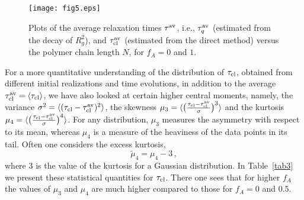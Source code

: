 \documentclass[aps,prx,reprint,showpacs,showkeys,noeprint,longbibliography]{revtex4-1} %
\begin{document}
\begin{figure}[t!]
	\centering
	\texttt{[image: fig5.eps]}
	\caption{\label{tau_fitcl}  Plots of the average relaxation times $\tau^{\rm{av}}$, i.e., $\tau_q^{\rm{av}}$ (estimated from the decay of $R_g^2$), and  $\tau_{\rm{cl}}^{\rm{av}}$ (estimated from the direct method)
		versus the polymer chain length $N$, for $f_A=0$ and $1$.}
\end{figure}
  \par 
  For a more quantitative understanding of the distribution of $\tau_{\rm{cl}}$, obtained from different initial realizations and time evolutions,  in addition to the average $\tau_{\rm{cl}}^{\rm{av}} = \langle \tau_{\rm{cl}} \rangle$, we have also looked at certain higher central moments, namely, the variance $\sigma^2=\langle (\tau_{\rm{cl}}-\tau_{\rm{cl}}^{\rm{av}})^2\rangle$, the skewness $\mu_3=\langle \big(\frac{\tau_{\rm{cl}}-\tau_{\rm{cl}}^{\rm{av}}}{\sigma}\big)^3\rangle$ and the kurtosis  $\mu_4=\langle \big(\frac{\tau_{\rm{cl}}-\tau_{\rm{cl}}^{\rm{av}}}{\sigma}\big)^4\rangle$. For any distribution, $\mu_3$ measures the asymmetry with respect to its mean, whereas $\mu_4$ is a measure of the  heaviness of the data points in its tail. Often one considers the excess kurtosis,
  \begin{equation}
  \tilde{\mu}_4 = \mu_4 -3\,,
  \end{equation}
  where $3$ is the value of the kurtosis for a Gaussian distribution. In Table~\ref{tab3} we present these statistical quantities for $\tau_{\rm{cl}}$. There one sees that for higher $f_A$ the values of $\mu_3$ and $\mu_4$ are much higher compared to those for $f_A=0$  and $0.5$.
  
\end{document}
